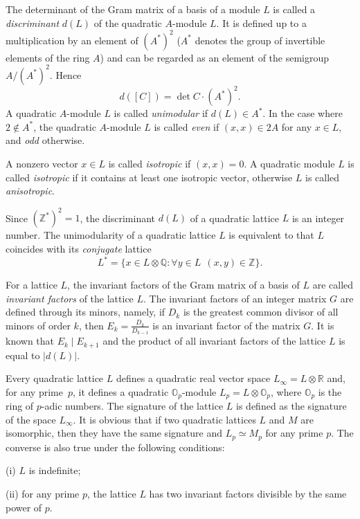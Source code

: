 \documentclass[14pt]{article}
\begin{document}
The determinant of the Gram matrix of a basis of a module $L$  is called
a \textit{discriminant} $d (L)$ of the quadratic $A$-module $L$.
It is defined up to a multiplication by an element of $(A^*)^2 $ ($ A ^ * $
denotes the group of invertible elements of the ring $A$) and can be regarded as
an element of the semigroup $ A /(A^*)^2$. Hence
$$
d ([C]) = \det C \cdot (A^*)^2.
$$
A quadratic $A$-module $L$ is called \textit{unimodular} if $d(L) \in A^*$.
In the case where $2 \not \in A^*$, the quadratic $A$-module $L$ is called
\textit{even} if $(x, x) \in 2A$ for any $x \in L$, and \textit{odd}
otherwise.

A nonzero vector $x \in L $ is called \textit{isotropic} if $(x, x) = 0$.
A quadratic
module $L$ is called \textit{isotropic} if it contains at least one
isotropic vector,
otherwise $L$ is called \textit{anisotropic}.

Since $(\mathbb{Z}^*)^2 = {1}$, the discriminant $d (L)$ of a
quadratic lattice $L$
is  an integer number. The unimodularity of a quadratic lattice $L$ is
equivalent to that $L$ coincides with its \textit {conjugate} lattice
$$
L^* = \{x \in L \otimes \mathbb{Q} \colon \forall y \in L \ \ (x, y)
\in \mathbb {Z} \}.
$$

For a lattice $L$, the invariant factors of the Gram matrix of a basis of $L$
are called \textit {invariant factors} of the lattice $L$.
The invariant factors of an integer matrix $G$ are defined through its
minors,
namely, if $D_k$ is
the greatest common divisor of all minors of order $k$, then
$E_k = \frac{D_k}{D_{k-1}}$ is an
invariant factor of the matrix $G$.
 It is known that
$ E_k \mid E_{k + 1} $ and the product of all invariant factors of the
lattice $L$ is equal to $|d(L)|$.

Every quadratic lattice $L$ defines a quadratic real vector
space
$L_{\infty} = L \otimes \mathbb{R}$ and, for any prime~$p$, it defines
a quadratic $\mathbb{O}_p$-module
$L_p = L \otimes \mathbb{O}_p$, where $\mathbb {O}_p$ is the ring
of $p$-adic numbers.
The signature of
 the lattice $ L $ is defined as the signature of the space $ L_{\infty}$.
 It is obvious that if two quadratic
lattices $L$ and $M$ are isomorphic, then
they have the same signature and $ L_p \simeq M_p $ for any prime $p$.
The converse is also true under the following conditions:

(i) $L$ is indefinite;

(ii) for any prime $ p $, the lattice $L$ has two invariant factors
divisible by  the same power of $p$.
\end{document}
